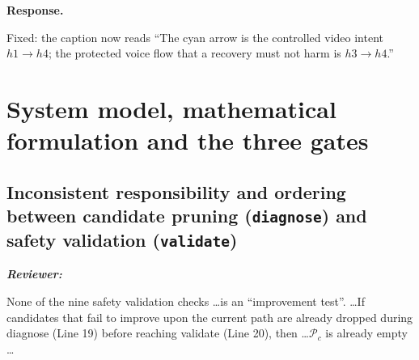 \documentclass[11pt,a4paper]{article}
\newenvironment{reviewer}{\par\medskip\noindent\begin{minipage}{\linewidth}\small\itshape\color{quote}\textbf{Reviewer:}\par}{\end{minipage}\medskip\par}
\newenvironment{response}{\par\noindent\begin{minipage}{\linewidth}\small\textbf{Response.}\par}{\end{minipage}\medskip\par}
\begin{document}
\begin{response}
Fixed: the caption now reads ``The cyan arrow is the controlled video
intent $h1\!\to\!h4$; the protected voice flow that a recovery must not
harm is $h3\!\to\!h4$.''
\end{response}

\section{System model, mathematical formulation and the three gates}

\subsection{Inconsistent responsibility and ordering between candidate
pruning (\texttt{diagnose}) and safety validation (\texttt{validate})}

\begin{reviewer}
None of the nine safety validation checks \dots is an ``improvement test''.
\dots If candidates that fail to improve upon the current path are already
dropped during diagnose (Line 19) before reaching validate (Line 20), then
\dots $\mathcal{P}_c$ is already empty \dots
\end{reviewer}
\end{document}
